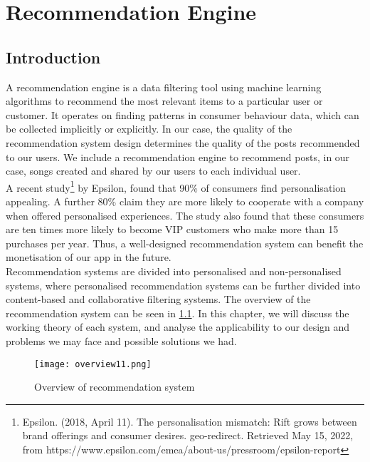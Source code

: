 

\chapter{Recommendation Engine}%
\label{Chapter6} %

\section{Introduction}
A recommendation engine is a data filtering tool using machine learning algorithms to recommend the most relevant items to a particular user or customer. It operates on finding patterns in consumer behaviour data, which can be collected implicitly or explicitly. In our case, the quality of the recommendation system design determines the quality of the posts recommended to our users. We include a recommendation engine to recommend posts, in our case, songs created and shared by our users to each individual user.
\\A recent study\footnote{Epsilon. (2018, April 11). The personalisation mismatch: Rift grows between brand offerings and consumer desires. geo-redirect. Retrieved May 15, 2022, from https://www.epsilon.com/emea/about-us/pressroom/epsilon-report } by Epsilon, found that 90\% of consumers find personalisation appealing. A further 80\% claim they are more likely to cooperate with a company when offered personalised experiences.
The study also found that these consumers are ten times more likely to become VIP customers who make more than 15 purchases per year.
Thus, a well-designed recommendation system can benefit the monetisation of our app in the future.
\\Recommendation systems are divided into personalised and non-personalised systems, where personalised recommendation systems can be further divided into content-based and collaborative filtering systems. 
The overview of the recommendation system can be seen in \cref{fig:overrecomm}. In this chapter, we will discuss the working theory of each system, and analyse the applicability to our design and problems we may face and possible solutions we had.
\begin{figure}[ht]
\centering
\texttt{[image: overview11.png]}
\caption{Overview of recommendation system}
\label{fig:overrecomm}
\end{figure}


